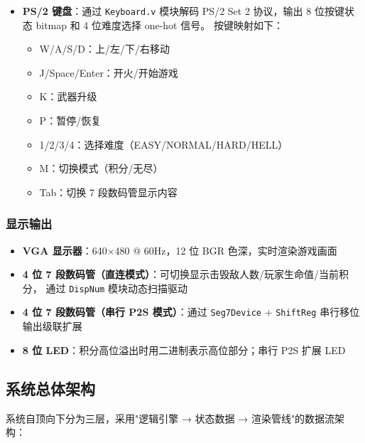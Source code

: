 \documentclass[12pt,a4paper]{ctexart}
\begin{document}
\begin{itemize}
    \item \textbf{PS/2 键盘}：通过 \texttt{Keyboard.v} 模块解码 PS/2 Set 2 协议，输出 8 位按键状态 bitmap
    和 4 位难度选择 one-hot 信号。
    按键映射如下：
    \begin{itemize}
        \item W/A/S/D：上/左/下/右移动
        \item J/Space/Enter：开火/开始游戏
        \item K：武器升级
        \item P：暂停/恢复
        \item 1/2/3/4：选择难度（EASY/NORMAL/HARD/HELL）
        \item M：切换模式（积分/无尽）
        \item Tab：切换 7 段数码管显示内容
    \end{itemize}
\end{itemize}

\subsubsection{显示输出}

\begin{itemize}
    \item \textbf{VGA 显示器}：640$\times$480 @ 60Hz，12 位 BGR 色深，实时渲染游戏画面
    \item \textbf{4 位 7 段数码管（直连模式）}：可切换显示击毁敌人数/玩家生命值/当前积分，
    通过 \texttt{DispNum} 模块动态扫描驱动
    \item \textbf{4 位 7 段数码管（串行 P2S 模式）}：通过 \texttt{Seg7Device} + \texttt{ShiftReg}
    串行移位输出级联扩展
    \item \textbf{8 位 LED}：积分高位溢出时用二进制表示高位部分；串行 P2S 扩展 LED
\end{itemize}

\subsection{系统总体架构}

系统自顶向下分为三层，采用"逻辑引擎 → 状态数据 → 渲染管线"的数据流架构：
\end{document}

